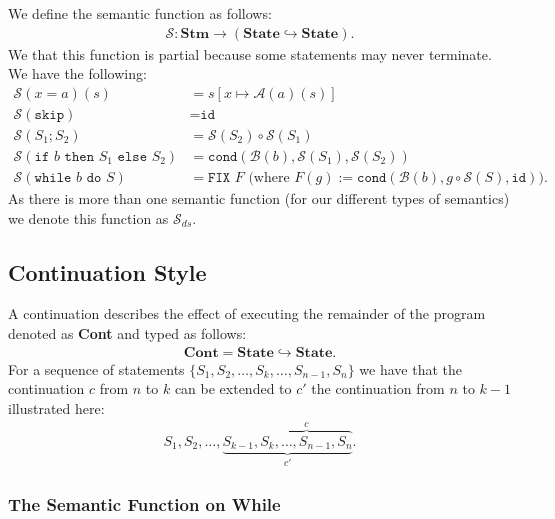 \documentclass[a4paper, 12pt, twoside]{article}
\begin{document}
We define the semantic function as follows: \begin{gather*}
  \mathcal{S}: \textbf{Stm} \to (\textbf{State} \hookrightarrow \textbf{State}).
\end{gather*} We that this function is partial because some statements
may never terminate. We have the following: \begin{align*}
  \mathcal{S}(x = a)(s) &= s[x \mapsto \mathcal{A}(a)(s)] \\
  \mathcal{S}(\texttt{skip}) &= \texttt{id} \\
  \mathcal{S}(S_1 ; S_2) &= \mathcal{S}(S_2) \circ \mathcal{S}(S_1) \\
  \mathcal{S}(\texttt{if } b \texttt{ then } S_1 \texttt{ else } S_2)
  &= \texttt{cond}(\mathcal{B}(b), \mathcal{S}(S_1), \mathcal{S}(S_2)) \\
  \mathcal{S}(\texttt{while } b \texttt{ do } S)
  &= \texttt{FIX } F \text{ (where } F(g) 
  := \texttt{cond}(\mathcal{B}(b), g \circ \mathcal{S}(S), \texttt{id})).
\end{align*} 
As there is more than one semantic function (for our different types
of semantics) we denote this function as $\mathcal{S}_{ds}$.

\subsection{Continuation Style}

A continuation describes the effect of executing the remainder of the
program denoted as \textbf{Cont} and typed as follows: \begin{gather*}
  \textbf{Cont} = \textbf{State} \hookrightarrow \textbf{State}.
\end{gather*} For a sequence of statements
$\{S_1, S_2, \ldots, S_k, \ldots, S_{n - 1}, S_n\}$
we have that the continuation $c$ from $n$ to $k$ can be extended
to $c'$ the continuation from $n$ to $k - 1$ illustrated here: \begin{gather*}
  S_1, S_2, \ldots, 
  \underbrace{S_{k - 1}, \overbrace{S_k, \ldots, S_{n - 1}, S_n}^c}_{c'}.
\end{gather*}

\subsubsection{The Semantic Function on \textbf{While}} 
\end{document}
